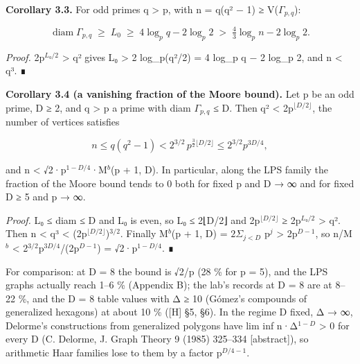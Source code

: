 \documentclass[
  10pt,
]{article}
\begin{document}
\textbf{Corollary 3.3.} For odd primes q \textgreater{} p, with n = q(q²
− 1) ≥ \textbar V(\(Γ_{p,q}\))\textbar:

\[\operatorname{diam}\Gamma_{p,q} \;\ge\; L_0 \;\ge\; 4\log_p q - 2\log_p 2 \;>\; \tfrac43 \log_p n - 2\log_p 2 .\]

\emph{Proof.} 2p\(^{L₀/2}\) \textgreater{} q² gives L₀ \textgreater{} 2
log\_p(q²/2) = 4 log\_p q − 2 log\_p 2, and n \textless{} q³. ∎

\textbf{Corollary 3.4 (a vanishing fraction of the Moore bound).} Let p
be an odd prime, D ≥ 2, and q \textgreater{} p a prime with diam
\(Γ_{p,q}\) ≤ D. Then q² \textless{} 2p\(^{⌊D/2⌋}\), the number of
vertices satisfies

\[n \le q(q^2-1) < 2^{3/2}\, p^{\frac32\lfloor D/2\rfloor} \le 2^{3/2} p^{3D/4},\]

and n \textless{} √2·p\(^{1−D/4}\)·M\(^{b}\)(p + 1, D). In particular,
along the LPS family the fraction of the Moore bound tends to 0 both for
fixed p and D → ∞ and for fixed D ≥ 5 and p → ∞.

\emph{Proof.} L₀ ≤ diam ≤ D and L₀ is even, so L₀ ≤ 2⌊D/2⌋ and
2p\(^{⌊D/2⌋}\) ≥ 2p\(^{L₀/2}\) \textgreater{} q². Then n \textless{} q³
\textless{} (2p\(^{⌊D/2⌋}\))\(^{3/2}\). Finally M\(^{b}\)(p + 1, D) =
\(2Σ_{j<D}\) p\(^{j}\) \textgreater{} 2p\(^{D−1}\), so n/M\(^{b}\)
\textless{} 2\(^{3/2}\)p\(^{3D/4}\)/(2p\(^{D−1}\)) = √2·p\(^{1−D/4}\). ∎

For comparison: at D = 8 the bound is √2/p (28 \% for p = 5), and the
LPS graphs actually reach 1--6 \% (Appendix B); the lab's records at D =
8 are at 8--22 \%, and the D = 8 table values with Δ ≥ 10 (Gómez's
compounds of generalized hexagons) at about 10 \% ({[}H{]} §5, §6). In
the regime D fixed, Δ → ∞, Delorme's constructions from generalized
polygons have lim inf n·Δ\(^{1−D}\) \textgreater{} 0 for every D (C.
Delorme, J. Graph Theory 9 (1985) 325--334 {[}abstract{]}), so
arithmetic Haar families lose to them by a factor p\(^{D/4−1}\).
\end{document}
